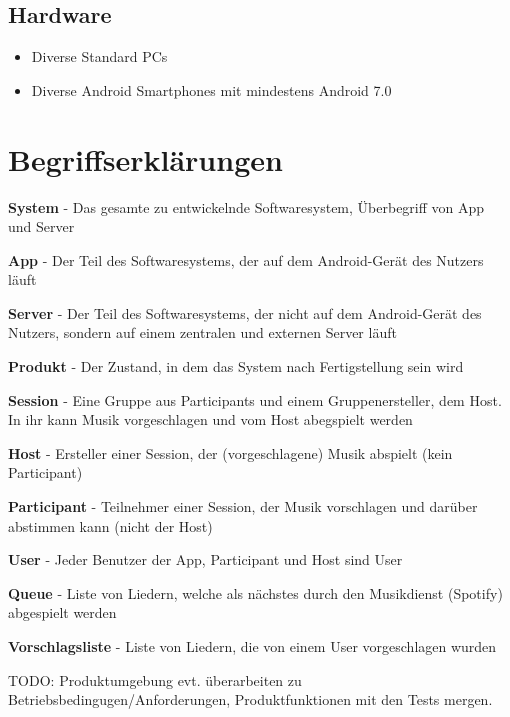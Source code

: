 \documentclass[oneside, ngerman]{sdqtechreport}
\begin{document}
\section{Hardware}
\label{sec:Entwicklungsumgebung:Hardware}

\begin{itemize}
    \item Diverse Standard PCs
    \item Diverse Android Smartphones mit mindestens Android 7.0
\end{itemize}


\chapter{Begriffserklärungen}
\label{chap:Begriffserklärungen}

\textbf{System}
 - Das gesamte zu entwickelnde Softwaresystem, Überbegriff von App und Server

\textbf{App}
 - Der Teil des Softwaresystems, der auf dem Android-Gerät des Nutzers läuft

\textbf{Server}
 - Der Teil des Softwaresystems, der nicht auf dem Android-Gerät des Nutzers, sondern auf einem zentralen und externen Server läuft

\textbf{Produkt}
 - Der Zustand, in dem das System nach Fertigstellung sein wird

\textbf{Session}
 - Eine Gruppe aus Participants und einem Gruppenersteller, dem Host. In ihr kann Musik vorgeschlagen und vom Host abegspielt werden

\textbf{Host}
 - Ersteller einer Session, der (vorgeschlagene) Musik abspielt (kein Participant)

\textbf{Participant}
 - Teilnehmer einer Session, der Musik vorschlagen und darüber abstimmen kann (nicht der Host)

\textbf{User}
 - Jeder Benutzer der App, Participant und Host sind User
 
\textbf{Queue}
 - Liste von Liedern, welche als nächstes durch den Musikdienst (Spotify) abgespielt werden

\textbf{Vorschlagsliste}
 - Liste von Liedern, die von einem User vorgeschlagen wurden


TODO: Produktumgebung evt. überarbeiten zu Betriebsbedingugen/Anforderungen, Produktfunktionen mit den Tests mergen.

\section{}
\end{document}
